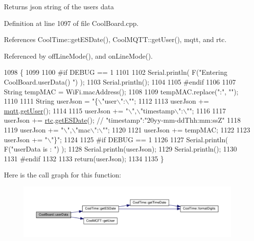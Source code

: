 \begin{DoxyReturn}{Returns}
json string of the user\textquotesingle{}s data 
\end{DoxyReturn}


Definition at line 1097 of file Cool\+Board.\+cpp.



References Cool\+Time\+::get\+E\+S\+Date(), Cool\+M\+Q\+T\+T\+::get\+User(), mqtt, and rtc.



Referenced by off\+Line\+Mode(), and on\+Line\+Mode().


\begin{DoxyCode}
1098 \{
1099 
1100 \textcolor{preprocessor}{#if DEBUG == 1}
1101 
1102     Serial.println( F(\textcolor{stringliteral}{"Entering CoolBoard.userData() "}) );
1103     Serial.println();
1104 
1105 \textcolor{preprocessor}{#endif}
1106 
1107     String tempMAC = WiFi.macAddress();
1108 
1109     tempMAC.replace(\textcolor{stringliteral}{":"}, \textcolor{stringliteral}{""});
1110 
1111     String userJson = \textcolor{stringliteral}{"\{\(\backslash\)"user\(\backslash\)":\(\backslash\)""};
1112 
1113     userJson += \hyperlink{classCoolBoard_a2399f44d7c23c1149a335cb3b46d90f1}{mqtt}.\hyperlink{classCoolMQTT_a373cc92fca7760d886f02d8a6e5b3f63}{getUser}();
1114 
1115     userJson += \textcolor{stringliteral}{"\(\backslash\)",\(\backslash\)"timestamp\(\backslash\)":\(\backslash\)""};
1116 
1117     userJson += \hyperlink{classCoolBoard_a50d2a6716879d64a85f3c6b44ad63275}{rtc}.\hyperlink{classCoolTime_ac4f32ee513c1328d984306645e8785a4}{getESDate}(); \textcolor{comment}{// "timestamp":"20yy-mm-ddThh:mm:ssZ"}
1118 
1119     userJson += \textcolor{stringliteral}{"\(\backslash\)",\(\backslash\)"mac\(\backslash\)":\(\backslash\)""};
1120 
1121     userJson += tempMAC;
1122 
1123     userJson += \textcolor{stringliteral}{"\(\backslash\)"\}"};
1124 
1125 \textcolor{preprocessor}{#if DEBUG == 1}
1126 
1127     Serial.println( F(\textcolor{stringliteral}{"userData is : "}) );
1128     Serial.println(userJson);
1129     Serial.println();
1130 
1131 \textcolor{preprocessor}{#endif  }
1132     
1133     \textcolor{keywordflow}{return}(userJson);
1134     
1135 \}
\end{DoxyCode}
Here is the call graph for this function\+:
\nopagebreak
\begin{figure}[H]
\begin{center}
\leavevmode
\includegraphics[width=350pt]{classCoolBoard_ae7358fb6e623cfc81b775f5f1734909b_cgraph}
\end{center}
\end{figure}
